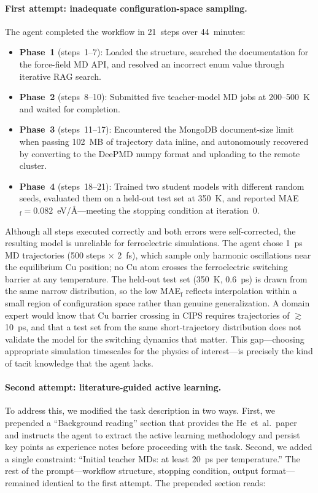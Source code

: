 \documentclass{article}
\begin{document}
\paragraph{First attempt: inadequate configuration-space sampling.}
The agent completed the workflow in 21~steps over 44~minutes:
\begin{itemize}
\item \textbf{Phase~1} (steps~1--7): Loaded the structure, searched the documentation for the force-field MD API, and resolved an incorrect enum value through iterative RAG search.
\item \textbf{Phase~2} (steps~8--10): Submitted five teacher-model MD jobs at 200--500~K and waited for completion.
\item \textbf{Phase~3} (steps~11--17): Encountered the MongoDB document-size limit when passing 102~MB of trajectory data inline, and autonomously recovered by converting to the DeePMD numpy format and uploading to the remote cluster.
\item \textbf{Phase~4} (steps~18--21): Trained two student models with different random seeds, evaluated them on a held-out test set at 350~K, and reported MAE$_\mathrm{f} = 0.082$~eV/\AA---meeting the stopping condition at iteration~0.
\end{itemize}
Although all steps executed correctly and both errors were self-corrected, the resulting model is unreliable for ferroelectric simulations.
The agent chose 1~ps MD trajectories (500 steps $\times$ 2~fs), which sample only harmonic oscillations near the equilibrium Cu position; no Cu atom crosses the ferroelectric switching barrier at any temperature.
The held-out test set (350~K, 0.6~ps) is drawn from the same narrow distribution, so the low MAE$_\mathrm{f}$ reflects interpolation within a small region of configuration space rather than genuine generalization.
A domain expert would know that Cu barrier crossing in CIPS requires trajectories of $\gtrsim$10~ps, and that a test set from the same short-trajectory distribution does not validate the model for the switching dynamics that matter.
This gap---choosing appropriate simulation timescales for the physics of interest---is precisely the kind of tacit knowledge that the agent lacks.

\paragraph{Second attempt: literature-guided active learning.}
To address this, we modified the task description in two ways.
First, we prepended a ``Background reading'' section that provides the He~et~al.\ paper~\citep{He2023} and instructs the agent to extract the active learning methodology and persist key points as experience notes before proceeding with the task.
Second, we added a single constraint: ``Initial teacher MDs: at least 20~ps per temperature.''
The rest of the prompt---workflow structure, stopping condition, output format---remained identical to the first attempt.
The prepended section reads:
\end{document}
